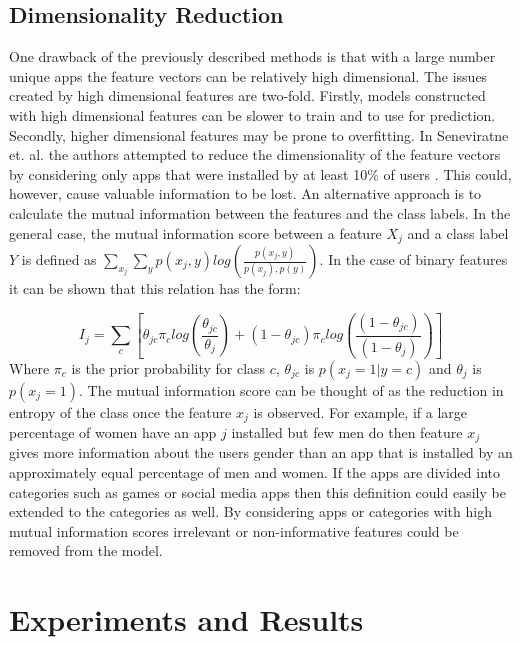\documentclass[10pt,twocolumn,letterpaper]{article}
\begin{document}
\subsection{Dimensionality Reduction}

One drawback of the previously described methods is that with a large number unique apps the feature vectors can be relatively high dimensional.  The issues created by high dimensional features are two-fold.  Firstly, models constructed with high dimensional features can be slower to train and to use for prediction.  Secondly, higher dimensional features may be prone to overfitting.  In Seneviratne et. al. the authors attempted to reduce the dimensionality of the feature vectors by considering only apps that were installed by at least 10\% of users \cite{Seneviratne:2014:YIA:2646584.2646587}.  This could, however, cause valuable information to be lost.  An alternative approach is to calculate the mutual information between the features and the class labels.  In the general case, the mutual information score between a feature $X_j$ and a class label $Y$ is defined as $\sum_{x_j}^{} \sum_{y}^{} p(x_j, y) log(\frac{p(x_j,y)}{p(x_j),p(y)})$.  In the case of binary features it can be shown that this relation has the form:

\begin{equation}
I_j = \sum_{c}^{}[\theta_{jc} \pi_c log(\frac{\theta_{jc}}{\theta_j}) + (1 -\theta_{jc}) \pi_c log(\frac{(1 - \theta_{jc})}{(1 - \theta_j)})]
\end{equation}
Where $\pi_c$ is the prior probability for class $c$, $\theta_{jc}$ is $p(x_j = 1 | y = c)$ and $\theta_j$ is $p(x_j = 1)$.  The mutual information score can be thought of as the reduction in entropy of the class once the feature $x_j$ is observed.  For example, if a large percentage of women have an app $j$ installed but few men do then feature
$x_j$ gives more information about the users gender than an app that is installed by an approximately equal percentage of men and women. If the apps are divided into categories such as games or social media apps then this definition could easily be extended to the categories as well.  By considering apps or categories with high mutual information scores irrelevant or non-informative features could be removed from the model.
\section{Experiments and Results}
\end{document}
